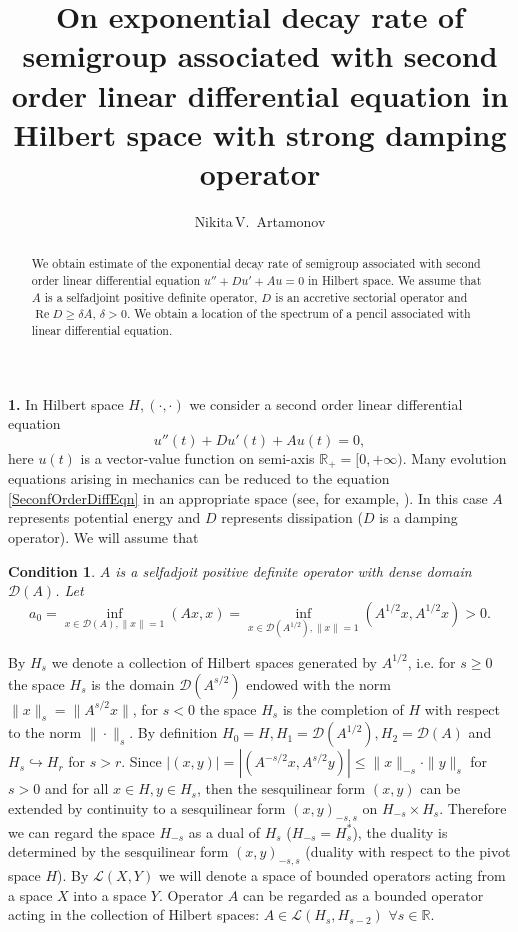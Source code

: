 \documentclass[12pt, reqno]{amsart}
\author{Nikita\,V.~Artamonov}
\title[On exponential decay rate of semigroup]{On exponential decay rate of semigroup associated with 
second order linear differential equation in Hilbert space with strong damping operator}
\theoremstyle{plain}
\newtheorem{condition}{Condition}
\begin{document}
\begin{abstract}
We obtain  estimate of the exponential decay rate of
semigroup associated with second order linear differential
equation $u''+Du'+Au=0$ in Hilbert space. We assume that $A$
is a selfadjoint positive definite operator,  $D$ is an accretive
sectorial operator and ${\operatorname{Re}} D\geq\delta A$, $\delta>0$.
We obtain a location of the spectrum of a pencil associated with
linear differential equation.

\end{abstract}

\maketitle

\textbf{1.}  In Hilbert space $H, (\cdot,\cdot)$ we consider a second order linear differential equation
 \begin{equation}\label{SeconfOrderDiffEqn}
  u''(t)+Du'(t)+Au(t)=0,
 \end{equation}
here $u(t)$ is a vector-value function on semi-axis ${{\mathbb R}}_+=[0,+\infty)$. Many evolution equations arising in mechanics
 can be reduced to the equation \eqref{SeconfOrderDiffEqn} in an appropriate
space (see, for example,  \cite{CramerLatushkin03, Huang97, JacobTrunk09}). In this case $A$ represents 
potential energy and $D$ represents dissipation ($D$ is a damping operator). We will assume that
\begin{condition}\label{ConditionA}
$A$ is a selfadjoit positive definite operator with dense domain ${{\mathcal D}}(A)$. Let
 \[
     a_0=\inf_{x\in{{\mathcal D}}(A),\|x\|=1}(A x,x)=
     \inf_{x\in{{\mathcal D}}(A^{1/2}),\|x\|=1}(A^{1/2} x,A^{1/2}x)>0.
 \]
\end{condition}
By $H_s$ we denote a collection of Hilbert spaces generated by $A^{1/2}$, i.e. for $s\geq0$ the space $H_s$ is the
domain ${{\mathcal D}}(A^{s/2})$ endowed with the norm $\|x\|_s=\|A^{s/2}x\|$, for $s<0$ the space $H_s$ is the completion of $H$
with respect to the norm $\|\cdot\|_s$. By definition $H_0=H,H_1={{\mathcal D}}(A^{1/2}),H_2={{\mathcal D}}(A)$ and 
$H_s\hookrightarrow H_r$ for $s>r$. Since $|(x,y)|=|(A^{-s/2}x,A^{s/2}y)|\leq\|x\|_{-s}\cdot\|y\|_s$  for $s>0$ and for all 
$x\in H, y\in H_s$, then the sesquilinear  form $(x,y)$ can be extended by continuity to a sesquilinear form 
$(x,y)_{-s,s}$ on $H_{-s}\times H_s$. Therefore we can regard the space $H_{-s}$ as a dual of $H_s$ ($H_{-s}=H_s^*$), 
the duality is determined by  the sesquilinear form $(x,y)_{-s,s}$ (duality with respect to the pivot space $H$). By ${{\mathcal{L} }}(X,Y)$
we will denote a space of bounded operators acting from a space $X$ into a space $Y$. Operator $A$ can be regarded
as a bounded operator acting in the collection of Hilbert spaces: $A\in{{\mathcal{L} }}(H_s,H_{s-2})$ $\forall s\in{{\mathbb R}}$.
\end{document}
